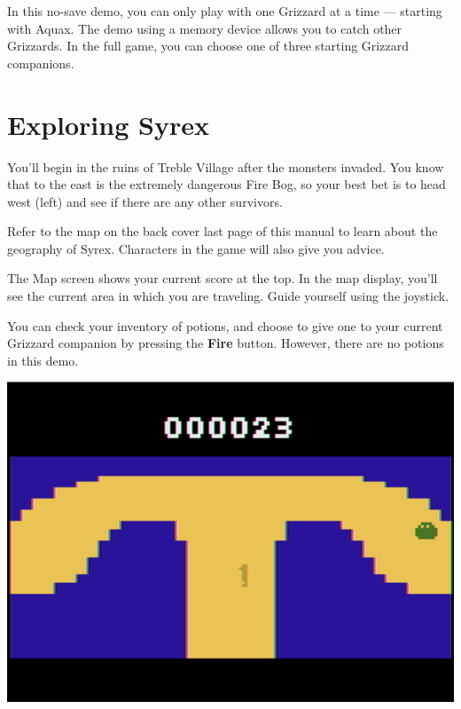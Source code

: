 \documentclass[10pt,twocolumn,openany,article]{memoir}
\begin{document}
\fi
\fi
\ifdefined\NOSAVE

In this no-save demo, you can only  play with one Grizzard at a time ---
starting with Aquax. The demo using  a memory device allows you to catch
other Grizzards. In the full game,  you can choose one of three starting
Grizzard companions.

\fi

\section{Exploring Syrex}

You'll begin in the ruins of  Treble Village after the monsters invaded.
You know that to  the east is the extremely dangerous  Fire Bog, so your
best  bet   is  to  head   west  (left)  and   see  if  there   are  any
other survivors.

Refer to  the map on  the \ifdefined\ATARIAGESAVE back cover  \else last
page  \fi{} of  this  manual  to learn  about  the  geography of  Syrex.
Characters in the game will also give you advice.

The Map screen shows your current score  at the top. In the map display,
you'll see the  current area in which you are  traveling. Guide yourself
using the joystick.

You can check your inventory of potions,  and choose to give one to your
current  Grizzard  companion  by   pressing  the  \textbf{Fire}  button.
\ifdefined\DEMO However, there are no potions in this demo. \fi

\begin{center}
  \includegraphics[width=\columnwidth]{../Manual/MapNTSC.png}
\end{center}
\end{document}
